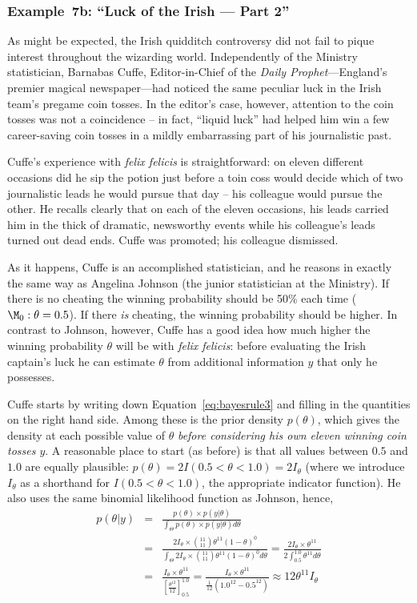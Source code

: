\subsubsection{Example~7b: ``Luck of the Irish --- Part 2''} \label{ex:irish2}
As might be expected, the Irish quidditch controversy did not fail to pique interest throughout the wizarding world. Independently of the Ministry statistician, Barnabas Cuffe, Editor-in-Chief of the \emph{Daily Prophet}---England's premier magical newspaper---had noticed the same peculiar luck in the Irish team's pregame coin tosses.  In the editor's case, however, attention to the coin tosses was not a coincidence -- in fact, ``liquid luck'' had helped him win a few career-saving coin tosses in a mildly embarrassing part of his journalistic past.

Cuffe's experience with \emph{felix felicis} is straightforward: on eleven different occasions did he sip the potion just before a toin coss would decide which of two journalistic leads he would pursue that day -- his colleague would pursue the other.  He recalls clearly that on each of the eleven occasions, his leads carried him in the thick of dramatic, newsworthy events while his colleague's leads turned out dead ends. Cuffe was promoted; his colleague dismissed.

As it happens, Cuffe is an accomplished statistician, and he reasons in exactly the same way as Angelina Johnson (the junior statistician at the Ministry). If there is no cheating the winning probability should be 50\% each time ($\M_0: \theta = 0.5$).  If there \emph{is} cheating, the winning probability should be higher.  In contrast to Johnson, however, Cuffe has a good idea how much higher the winning probability $\theta$ will be with \emph{felix felicis}: before evaluating the Irish captain's luck he can estimate $\theta$ from additional information $y$ that only he possesses.

Cuffe starts by writing down Equation~\ref{eq:bayesrule3} and filling in the quantities on the right hand side.  Among these is the prior density $p(\theta)$, which gives the density at each possible value of $\theta$ \emph{before considering his own eleven winning coin tosses $y$}.  A reasonable place to start (as before) is that all values between $0.5$ and $1.0$ are equally plausible: $p(\theta) = 2I(0.5<\theta<1.0) = 2I_\theta$ (where we introduce $I_\theta$ as a shorthand for $I(0.5<\theta<1.0)$, the appropriate indicator function).  He also uses the same binomial likelihood function as Johnson, hence,
\begin{eqnarray*}
p(\theta|y) &=& \frac{p(\theta) \times p(y|\theta)}{\int_{\Theta}p(\theta) \times p(y|\theta)d\theta}\\
&=& \frac{2I_\theta \times \binom{11}{11}\theta^{11}(1-\theta)^0}{\int_{\Theta}2I_\theta \times \binom{11}{11}\theta^{11}(1-\theta)^0d\theta}
= \frac{2I_\theta \times\theta^{11}}{2\int_{0.5}^{1.0} \theta^{11} d\theta}\\
&=& \frac{I_\theta \times\theta^{11}}{\left[\frac{\theta^{12}}{12}\right]_{0.5}^{1.0}} = \frac{I_\theta \times\theta^{11}}{\frac{1}{12}\left(1.0^{12} - 0.5^{12}\right)}
\approx 12\theta^{11}I_\theta
\end{eqnarray*}

